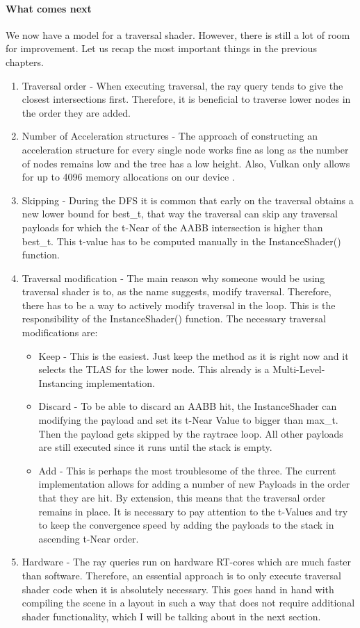 \paragraph{What comes next}
We now have a model for a traversal shader. However, there is still a lot of room for improvement. Let us recap the most important things in the previous chapters.
\begin{enumerate}
    \item Traversal order - When executing traversal, the ray query tends to give the closest intersections first. Therefore, it is beneficial to traverse lower nodes in the order they are added.
    \item Number of Acceleration structures - The approach of constructing an acceleration structure for every single node works fine as long as the number of nodes remains low and the tree has a low height. Also, Vulkan only allows for up to 4096 memory allocations on our device \cite{vulkanSpec}.
    \item Skipping - During the DFS it is common that early on the traversal obtains a new lower bound for best\_t, that way the traversal can skip any traversal payloads for which the t-Near of the AABB intersection is higher than best\_t. This t-value has to be computed manually in the InstanceShader() function.
    \item Traversal modification - The main reason why someone would be using traversal shader is to, as the name suggests, modify traversal. Therefore, there has to be a way to actively modify traversal in the loop. This is the responsibility of the InstanceShader() function.
    The necessary traversal modifications are:
    \begin{itemize}
        \item Keep - This is the easiest. Just keep the method as it is right now and it selects the TLAS for the lower node. This already is a Multi-Level-Instancing implementation.
        \item Discard - To be able to discard an AABB hit, the InstanceShader can modifying the payload and set its t-Near Value to bigger than max\_t. Then the payload gets skipped by the raytrace loop. All other payloads are still executed since it runs until the stack is empty.
        \item Add - This is perhaps the most troublesome of the three. The current implementation allows for adding a number of new Payloads in the order that they are hit. By extension, this means that the traversal order remains in place. It is necessary to pay attention to the t-Values and try to keep the convergence speed by adding the payloads to the stack in ascending t-Near order.
    \end{itemize}
    \item Hardware - The ray queries run on hardware RT-cores which are much faster than software. Therefore, an essential approach is to only execute traversal shader code when it is absolutely necessary. This goes hand in hand with compiling the scene in a layout in such a way that does not require additional shader functionality, which I will be talking about in the next section.
\end{enumerate}
\newpage
